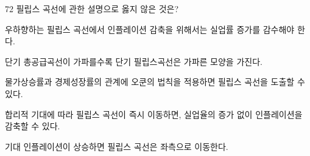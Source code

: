 \begin{question}{72}
필립스 곡선에 관한 설명으로 옳지 않은 것은?
\begin{choices}
  \item 우하향하는 필립스 곡선에서 인플레이션 감축을 위해서는 실업률 증가를 감수해야 한다.
  \item 단기 총공급곡선이 가파를수록 단기 필립스곡선은 가파른 모양을 가진다.
  \item 물가상승률과 경제성장률의 관계에 오쿤의 법칙을 적용하면 필립스 곡선을 도출할 수 있다.
  \item 합리적 기대에 따라 필립스 곡선이 즉시 이동하면, 실업율의 증가 없이 인플레이션을 감축할 수 있다.
  \item 기대 인플레이션이 상승하면 필립스 곡선은 좌측으로 이동한다.
\end{choices}
\end{question}
